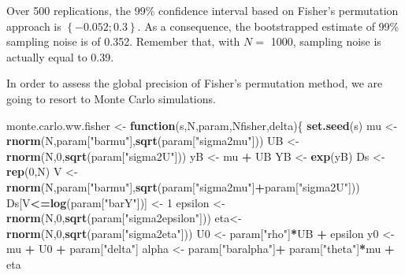\documentclass[]{book}
\newenvironment{Shaded}{\begin{snugshade}}{\end{snugshade}}
\newcommand{\ControlFlowTok}[1]{\textcolor[rgb]{0.13,0.29,0.53}{\textbf{#1}}}
\newcommand{\DecValTok}[1]{\textcolor[rgb]{0.00,0.00,0.81}{#1}}
\newcommand{\KeywordTok}[1]{\textcolor[rgb]{0.13,0.29,0.53}{\textbf{#1}}}
\newcommand{\NormalTok}[1]{#1}
\newcommand{\OperatorTok}[1]{\textcolor[rgb]{0.81,0.36,0.00}{\textbf{#1}}}
\newcommand{\StringTok}[1]{\textcolor[rgb]{0.31,0.60,0.02}{#1}}
\theoremstyle{definition}
\theoremstyle{definition}
\theoremstyle{definition}
\theoremstyle{remark}
\begin{document}
Over 500 replications, the 99\% confidence interval based on Fisher's permutation approach is \(\left\{-0.052;0.3\right\}\).
As a consequence, the bootstrapped estimate of 99\% sampling noise is of 0.352.
Remember that, with \(N=\) 1000, sampling noise is actually equal to 0.39.

In order to assess the global precision of Fisher's permutation method, we are going to resort to Monte Carlo simulations.

\begin{Shaded}
\begin{Highlighting}[]
\NormalTok{monte.carlo.ww.fisher <-}\StringTok{ }\ControlFlowTok{function}\NormalTok{(s,N,param,Nfisher,delta)\{}
  \KeywordTok{set.seed}\NormalTok{(s)}
\NormalTok{  mu <-}\StringTok{ }\KeywordTok{rnorm}\NormalTok{(N,param[}\StringTok{"barmu"}\NormalTok{],}\KeywordTok{sqrt}\NormalTok{(param[}\StringTok{"sigma2mu"}\NormalTok{]))}
\NormalTok{  UB <-}\StringTok{ }\KeywordTok{rnorm}\NormalTok{(N,}\DecValTok{0}\NormalTok{,}\KeywordTok{sqrt}\NormalTok{(param[}\StringTok{"sigma2U"}\NormalTok{]))}
\NormalTok{  yB <-}\StringTok{ }\NormalTok{mu }\OperatorTok{+}\StringTok{ }\NormalTok{UB }
\NormalTok{  YB <-}\StringTok{ }\KeywordTok{exp}\NormalTok{(yB)}
\NormalTok{  Ds <-}\StringTok{ }\KeywordTok{rep}\NormalTok{(}\DecValTok{0}\NormalTok{,N)}
\NormalTok{  V <-}\StringTok{ }\KeywordTok{rnorm}\NormalTok{(N,param[}\StringTok{"barmu"}\NormalTok{],}\KeywordTok{sqrt}\NormalTok{(param[}\StringTok{"sigma2mu"}\NormalTok{]}\OperatorTok{+}\NormalTok{param[}\StringTok{"sigma2U"}\NormalTok{]))}
\NormalTok{  Ds[V}\OperatorTok{<=}\KeywordTok{log}\NormalTok{(param[}\StringTok{"barY"}\NormalTok{])] <-}\StringTok{ }\DecValTok{1} 
\NormalTok{  epsilon <-}\StringTok{ }\KeywordTok{rnorm}\NormalTok{(N,}\DecValTok{0}\NormalTok{,}\KeywordTok{sqrt}\NormalTok{(param[}\StringTok{"sigma2epsilon"}\NormalTok{]))}
\NormalTok{  eta<-}\StringTok{ }\KeywordTok{rnorm}\NormalTok{(N,}\DecValTok{0}\NormalTok{,}\KeywordTok{sqrt}\NormalTok{(param[}\StringTok{"sigma2eta"}\NormalTok{]))}
\NormalTok{  U0 <-}\StringTok{ }\NormalTok{param[}\StringTok{"rho"}\NormalTok{]}\OperatorTok{*}\NormalTok{UB }\OperatorTok{+}\StringTok{ }\NormalTok{epsilon}
\NormalTok{  y0 <-}\StringTok{ }\NormalTok{mu }\OperatorTok{+}\StringTok{  }\NormalTok{U0 }\OperatorTok{+}\StringTok{ }\NormalTok{param[}\StringTok{"delta"}\NormalTok{]}
\NormalTok{  alpha <-}\StringTok{ }\NormalTok{param[}\StringTok{"baralpha"}\NormalTok{]}\OperatorTok{+}\StringTok{  }\NormalTok{param[}\StringTok{"theta"}\NormalTok{]}\OperatorTok{*}\NormalTok{mu }\OperatorTok{+}\StringTok{ }\NormalTok{eta}

\end{Highlighting}
\end{Shaded}
\end{document}
